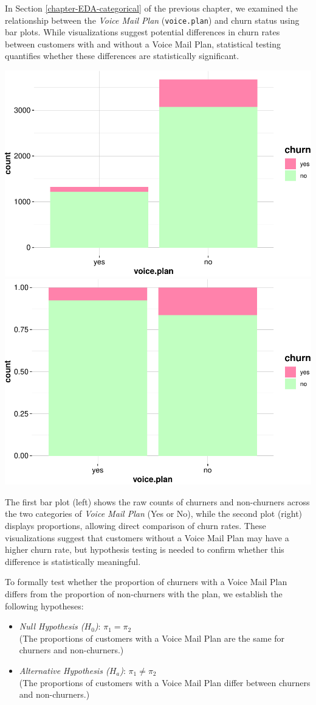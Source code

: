 \documentclass[
]{book}
\newcommand{\passthrough}[1]{#1}
\theoremstyle{definition}
\theoremstyle{definition}
\theoremstyle{definition}
\theoremstyle{definition}
\theoremstyle{remark}
\begin{document}
In Section \ref{chapter-EDA-categorical} of the previous chapter, we examined the relationship between the \emph{Voice Mail Plan} (\passthrough{\lstinline!voice.plan!}) and churn status using bar plots. While visualizations suggest potential differences in churn rates between customers with and without a Voice Mail Plan, statistical testing quantifies whether these differences are statistically significant.

\includegraphics[width=0.5\linewidth]{statistics_files/figure-latex/unnamed-chunk-10-1} \includegraphics[width=0.5\linewidth]{statistics_files/figure-latex/unnamed-chunk-10-2}

The first bar plot (left) shows the raw counts of churners and non-churners across the two categories of \emph{Voice Mail Plan} (Yes or No), while the second plot (right) displays proportions, allowing direct comparison of churn rates. These visualizations suggest that customers without a Voice Mail Plan may have a higher churn rate, but hypothesis testing is needed to confirm whether this difference is statistically meaningful.

To formally test whether the proportion of churners with a Voice Mail Plan differs from the proportion of non-churners with the plan, we establish the following hypotheses:

\begin{itemize}
\item
  \emph{Null Hypothesis (\(H_0\))}: \(\pi_1 = \pi_2\)\\
  (The proportions of customers with a Voice Mail Plan are the same for churners and non-churners.)
\item
  \emph{Alternative Hypothesis (\(H_a\))}: \(\pi_1 \neq \pi_2\)\\
  (The proportions of customers with a Voice Mail Plan differ between churners and non-churners.)
\end{itemize}
\end{document}
